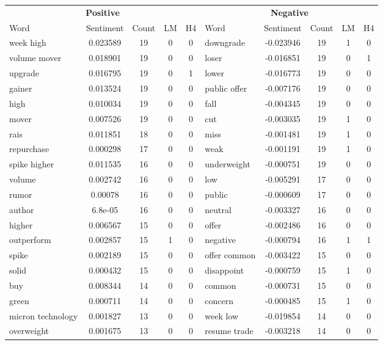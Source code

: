 \documentclass[ oneside,%
                    author={Joshua Felmeden},
                    degree={MEng},
                     title={Sentiment Analysis of Financial Headlines Based on Realised Stock Returns},
                  subtitle={Research}]{dissertation}
\begin{document}
\begin{table}[!ht]
\centering
\begin{tabular}{lcccclcccc}
\multicolumn{5}{c}{\textbf{Positive}} & \multicolumn{5}{c}{\textbf{Negative}} \\
\cmidrule(lr){1-5}
\cmidrule(lr){6-10}
Word & Sentiment & Count & LM & H4 & Word & Sentiment & Count & LM & H4 \\
\cmidrule(lr){1-5}
\cmidrule(lr){6-10}
week high & 0.023589 & 19 & 0 & 0 & downgrade & -0.023946 & 19 & 1 & 0 \\
volume mover & 0.018901 & 19 & 0 & 0 & loser & -0.016851 & 19 & 0 & 1 \\
upgrade & 0.016795 & 19 & 0 & 1 & lower & -0.016773 & 19 & 0 & 0 \\
gainer & 0.013524 & 19 & 0 & 0 & public offer & -0.007176 & 19 & 0 & 0 \\
high & 0.010034 & 19 & 0 & 0 & fall & -0.004345 & 19 & 0 & 0 \\
mover & 0.007526 & 19 & 0 & 0 & cut & -0.003035 & 19 & 1 & 0 \\
rais & 0.011851 & 18 & 0 & 0 & miss & -0.001481 & 19 & 1 & 0 \\
repurchase & 0.000298 & 17 & 0 & 0 & weak & -0.001191 & 19 & 1 & 0 \\
spike higher & 0.011535 & 16 & 0 & 0 & underweight & -0.000751 & 19 & 0 & 0 \\
volume & 0.002742 & 16 & 0 & 0 & low & -0.005291 & 17 & 0 & 0 \\
rumor & 0.00078 & 16 & 0 & 0 & public & -0.000609 & 17 & 0 & 0 \\
author & 6.8e-05 & 16 & 0 & 0 & neutral & -0.003327 & 16 & 0 & 0 \\
higher & 0.006567 & 15 & 0 & 0 & offer & -0.002486 & 16 & 0 & 0 \\
outperform & 0.002857 & 15 & 1 & 0 & negative & -0.000794 & 16 & 1 & 1 \\
spike & 0.002189 & 15 & 0 & 0 & offer common & -0.003422 & 15 & 0 & 0 \\
solid & 0.000432 & 15 & 0 & 0 & disappoint & -0.000759 & 15 & 1 & 0 \\
buy & 0.008344 & 14 & 0 & 0 & common & -0.000731 & 15 & 0 & 0 \\
green & 0.000711 & 14 & 0 & 0 & concern & -0.000485 & 15 & 1 & 0 \\
micron technology & 0.001827 & 13 & 0 & 0 & week low & -0.019854 & 14 & 0 & 0 \\
overweight & 0.001675 & 13 & 0 & 0 & resume trade & -0.003218 & 14 & 0 & 0 \\

\end{tabular}
\end{table}
\end{document}

